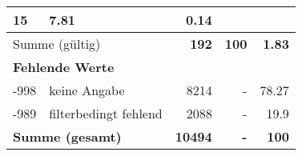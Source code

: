 \begin{longtable}{lXrrr}
       \num{15} &
       \num[round-mode=places,round-precision=2]{7.81} &
         \num[round-mode=places,round-precision=2]{0.14} \\
     \midrule
     \multicolumn{2}{l}{Summe (gültig)} &
       \textbf{\num{192}} &
     \textbf{\num{100}} &
       \textbf{\num[round-mode=places,round-precision=2]{1.83}} \\
     \multicolumn{5}{l}{\textbf{Fehlende Werte}}\\
       -998 &
       keine Angabe &
         \num{8214} &
        - &
         \num[round-mode=places,round-precision=2]{78.27} \\
       -989 &
       filterbedingt fehlend &
         \num{2088} &
        - &
         \num[round-mode=places,round-precision=2]{19.9} \\
     \midrule
     \multicolumn{2}{l}{\textbf{Summe (gesamt)}} &
          \textbf{\num{10494}} &
        \textbf{-} &
        \textbf{\num{100}} \\
     \bottomrule
     \end{longtable}
     

